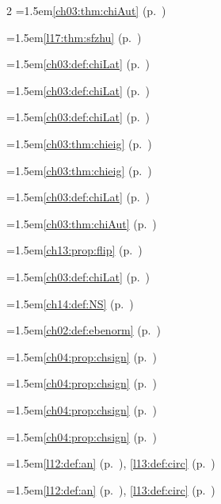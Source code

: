 \begin{multicols}{2}
\hangindent=1.5em\quad \ref{ch03:thm:chiAut} (p.~\pageref{ch03:thm:chiAut})\par
\hangindent=1.5em\quad \ref{l17:thm:sfzhu} (p.~\pageref{l17:thm:sfzhu})\par
\hangindent=1.5em\quad \ref{ch03:def:chiLat} (p.~\pageref{ch03:def:chiLat})\par
\hangindent=1.5em\quad \ref{ch03:def:chiLat} (p.~\pageref{ch03:def:chiLat})\par
\hangindent=1.5em\quad \ref{ch03:def:chiLat} (p.~\pageref{ch03:def:chiLat})\par
\hangindent=1.5em\quad \ref{ch03:thm:chieig} (p.~\pageref{ch03:thm:chieig})\par
\hangindent=1.5em\quad \ref{ch03:thm:chieig} (p.~\pageref{ch03:thm:chieig})\par
\hangindent=1.5em\quad \ref{ch03:def:chiLat} (p.~\pageref{ch03:def:chiLat})\par
\hangindent=1.5em\quad \ref{ch03:thm:chiAut} (p.~\pageref{ch03:thm:chiAut})\par
\hangindent=1.5em\quad \ref{ch13:prop:flip} (p.~\pageref{ch13:prop:flip})\par
\hangindent=1.5em\quad \ref{ch03:def:chiLat} (p.~\pageref{ch03:def:chiLat})\par
\hangindent=1.5em\quad \ref{ch14:def:NS} (p.~\pageref{ch14:def:NS})\par
\hangindent=1.5em\quad \ref{ch02:def:ebenorm} (p.~\pageref{ch02:def:ebenorm})\par
\hangindent=1.5em\quad \ref{ch04:prop:chsign} (p.~\pageref{ch04:prop:chsign})\par
\hangindent=1.5em\quad \ref{ch04:prop:chsign} (p.~\pageref{ch04:prop:chsign})\par
\hangindent=1.5em\quad \ref{ch04:prop:chsign} (p.~\pageref{ch04:prop:chsign})\par
\hangindent=1.5em\quad \ref{ch04:prop:chsign} (p.~\pageref{ch04:prop:chsign})\par
\hangindent=1.5em\quad \ref{l12:def:an} (p.~\pageref{l12:def:an}), \ref{l13:def:circ} (p.~\pageref{l13:def:circ})\par
\hangindent=1.5em\quad \ref{l12:def:an} (p.~\pageref{l12:def:an}), \ref{l13:def:circ} (p.~\pageref{l13:def:circ})\par

\end{multicols}
